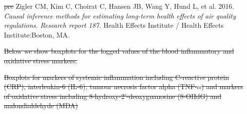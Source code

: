 \documentclass[
  letterpaper,
  DIV=11,
  numbers=noendperiod]{scrartcl}
\makeatletter
\newlength{\cslhangindent}
\newenvironment{CSLReferences}[2] %
 {\begin{list}{}{%
  \setlength{\itemindent}{0pt} %
  \setlength{\leftmargin}{0pt} %
  \setlength{\parsep}{0pt} %
  \ifodd #1
   \setlength{\leftmargin}{\cslhangindent} %
   \setlength{\itemindent}{-1\cslhangindent} %
  \fi
  \setlength{\itemsep}{#2\baselineskip}}} %
 {\end{list}} %
\renewenvironment{figure}%
   {\renewcommand\familydefault\sfdefault
    \@float{figure}}
   {\end@float}
\providecommand{\DIFdeltex}[1]{{\protect\color{red}\sout{#1}}}                      %
\providecommand{\DIFaddbegin}{} %
\providecommand{\DIFaddend}{} %
\providecommand{\DIFdelbegin}{} %
\providecommand{\DIFdelend}{} %
\providecommand{\DIFdelFL}[1]{\DIFdel{#1}} %
\providecommand{\DIFdel}[1]{\texorpdfstring{\DIFdeltex{#1}}{}} %
\newcommand{\DIFscaledelfig}{0.5}
\newlength{\DIFdelgraphicswidth} %
\newlength{\DIFdelgraphicsheight} %
\newcommand{\DIFaddincludegraphics}[2][]{{\color{blue}\fbox{\DIFOincludegraphics[#1]{#2}}}} %
\newcommand{\DIFdelincludegraphics}[2][]{%
\sbox{\DIFdelgraphicsbox}{\DIFOincludegraphics[#1]{#2}}%
\settoboxwidth{\DIFdelgraphicswidth}{\DIFdelgraphicsbox} %
\settoboxtotalheight{\DIFdelgraphicsheight}{\DIFdelgraphicsbox} %
\scalebox{\DIFscaledelfig}{%
\parbox[b]{\DIFdelgraphicswidth}{\usebox{\DIFdelgraphicsbox}\\[-\baselineskip] \rule{\DIFdelgraphicswidth}{0em}}\llap{\resizebox{\DIFdelgraphicswidth}{\DIFdelgraphicsheight}{%
\setlength{\unitlength}{\DIFdelgraphicswidth}%
\begin{picture}(1,1)%
\thicklines\linethickness{2pt} %
{\color[rgb]{1,0,0}\put(0,0){\framebox(1,1){}}}%
{\color[rgb]{1,0,0}\put(0,0){\line( 1,1){1}}}%
{\color[rgb]{1,0,0}\put(0,1){\line(1,-1){1}}}%
\end{picture}%
}\hspace*{3pt}}} %
} %
\DeclareRobustCommand{\DIFaddbegin}{\DIFOaddbegin \let\includegraphics\DIFaddincludegraphics} %
\DeclareRobustCommand{\DIFaddend}{\DIFOaddend \let\includegraphics\DIFOincludegraphics} %
\DeclareRobustCommand{\DIFdelbegin}{\DIFOdelbegin \let\includegraphics\DIFdelincludegraphics} %
\DeclareRobustCommand{\DIFdelend}{\DIFOaddend \let\includegraphics\DIFOincludegraphics} %
\makeatother
\begin{document}
\begin{CSLReferences}{1}{1}
\DIFdelbegin %
\DIFdel{pre}%
\DIFdelend \DIFaddbegin {}
\DIFaddend Zigler CM, Kim C, Choirat C, Hansen JB, Wang Y, Hund L, et al. 2016.
\emph{Causal inference methods for estimating long-term health effects
of air quality regulations. {Research} report 187.} Health Effects
Institute / Health Effects Institute:Boston, MA.

\end{CSLReferences}
\DIFdelbegin %




\DIFdel{Below we show boxplots for the logged values of the blood inflammatory
and oxidative stress markers.
}%




{%
\DIFdelFL{Boxplots for markers of systemic
inflammation including C-reactive protein (CRP), interleukin-6 (IL-6),
tumour necrosis factor alpha (TNF-\(\alpha\)) and markers of oxidative
stress including 8-hydroxy-2'-deoxyguanosine (8-OHdG) and
malondialdehyde (MDA)}}

\end{document}
